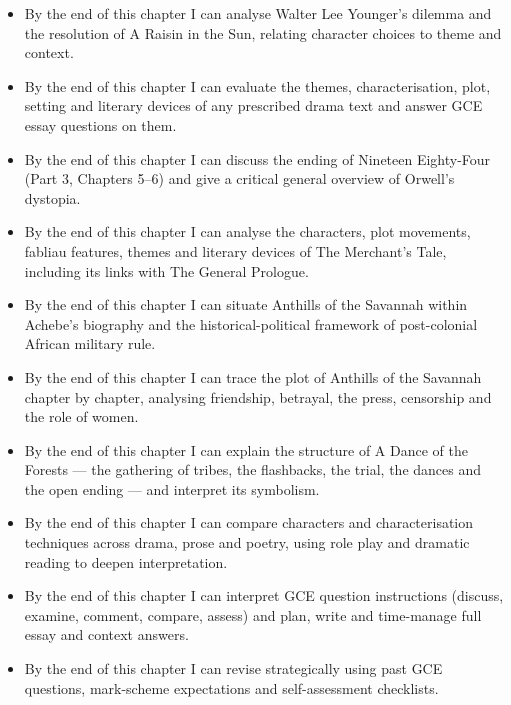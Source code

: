 \documentclass[11pt]{article}
\begin{document}
\begin{objectifs}
\begin{itemize}
\item By the end of this chapter I can analyse Walter Lee Younger's dilemma and the resolution of A Raisin in the Sun, relating character choices to theme and context.
\item By the end of this chapter I can evaluate the themes, characterisation, plot, setting and literary devices of any prescribed drama text and answer GCE essay questions on them.
\item By the end of this chapter I can discuss the ending of Nineteen Eighty-Four (Part 3, Chapters 5–6) and give a critical general overview of Orwell's dystopia.
\item By the end of this chapter I can analyse the characters, plot movements, fabliau features, themes and literary devices of The Merchant's Tale, including its links with The General Prologue.
\item By the end of this chapter I can situate Anthills of the Savannah within Achebe's biography and the historical-political framework of post-colonial African military rule.
\item By the end of this chapter I can trace the plot of Anthills of the Savannah chapter by chapter, analysing friendship, betrayal, the press, censorship and the role of women.
\item By the end of this chapter I can explain the structure of A Dance of the Forests — the gathering of tribes, the flashbacks, the trial, the dances and the open ending — and interpret its symbolism.
\item By the end of this chapter I can compare characters and characterisation techniques across drama, prose and poetry, using role play and dramatic reading to deepen interpretation.
\item By the end of this chapter I can interpret GCE question instructions (discuss, examine, comment, compare, assess) and plan, write and time-manage full essay and context answers.
\item By the end of this chapter I can revise strategically using past GCE questions, mark-scheme expectations and self-assessment checklists.
\end{itemize}
\end{objectifs}
\end{document}
